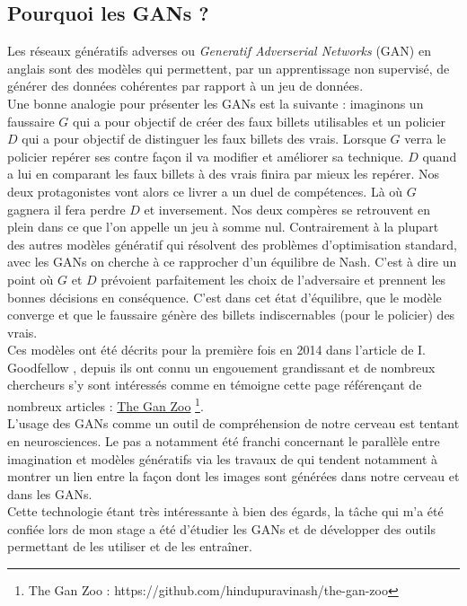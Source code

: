 \documentclass[11pt,francais]{article}
\begin{document}
\subsection{Pourquoi les GANs ?}
\label{sec:Intro}
Les réseaux génératifs adverses ou \textit{Generatif Adverserial Networks} (GAN) en anglais sont des modèles qui permettent, par un apprentissage non supervisé, de générer des données cohérentes par rapport à un jeu de données.\\
Une bonne analogie pour présenter les GANs est la suivante : imaginons un faussaire \(G\) qui a pour objectif de créer des faux billets utilisables et un policier \(D\) qui a pour objectif de distinguer les faux billets des vrais.
Lorsque \(G\) verra le policier repérer ses contre façon il va modifier et améliorer sa technique. \(D\) quand a lui en comparant les faux billets à des vrais finira par mieux les repérer. Nos deux protagonistes vont alors ce livrer a un duel de compétences. Là où \(G\) gagnera il fera perdre \(D\) et inversement. Nos deux compères se retrouvent en plein dans ce que l'on appelle un jeu à somme nul. Contrairement à la plupart des autres modèles génératif qui résolvent des problèmes d'optimisation standard, avec les GANs on cherche à ce rapprocher d'un équilibre de Nash. C'est à dire un point où \(G\) et \(D\) prévoient parfaitement les choix de l'adversaire et prennent les bonnes décisions en conséquence. C'est dans cet état d'équilibre, que le modèle converge et que le faussaire génère des billets indiscernables (pour le policier) des vrais.\\
Ces modèles ont été décrits pour la première fois en 2014 dans l'article de I. Goodfellow \cite{NIPS2014_5423}, depuis ils ont connu un engouement grandissant et de nombreux chercheurs s'y sont intéressés comme en témoigne cette page référençant de nombreux articles : \href{https://github.com/hindupuravinash/the-gan-zoo}{The Gan Zoo} \footnote{\label{note1}The Gan Zoo : https://github.com/hindupuravinash/the-gan-zoo}.\\ 
L'usage des GANs comme un outil de compréhension de notre cerveau est tentant en neurosciences. Le pas a notamment été franchi concernant le parallèle entre imagination et modèles génératifs via les travaux de \cite{GAN_Brain_Signals} qui tendent notamment à montrer un lien entre la façon dont les images sont générées dans notre cerveau et dans les GANs. \\
Cette technologie étant très intéressante à bien des égards, la tâche qui m'a été confiée lors de mon stage a été d'étudier les GANs et de développer des outils permettant de les utiliser et de les entraîner.
\end{document}
